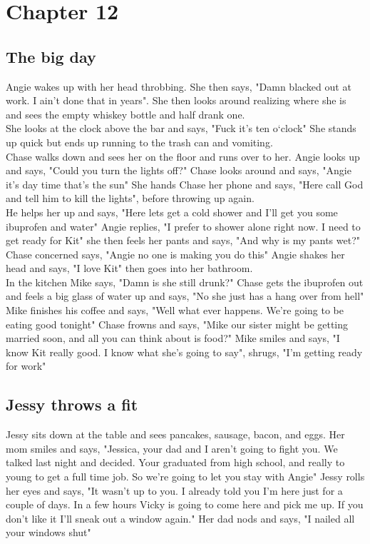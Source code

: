 \documentclass{article}[12px]
\begin{document}
\section* {Chapter 12}
\subsection* {The big day}
	Angie wakes up with her head throbbing. She then says, "Damn blacked out at work. I ain't done that in years". She then looks around realizing where she is and sees the empty whiskey bottle and half drank one.\\

	She looks at the clock above the bar and says, "Fuck it's ten o`clock" She stands up quick but ends up running to the trash can and vomiting.\\

	Chase walks down and sees her on the floor and runs over to her. Angie looks up and says, "Could you turn the lights off?" Chase looks around and says, "Angie it's day time that's the sun" She hands Chase her phone and says, "Here call God and tell him to kill the lights", before throwing up again.\\

	He  helps her up and says, "Here lets get a cold shower and I'll get you some ibuprofen and water" Angie replies, "I prefer to shower alone right now. I need to get ready for Kit" she then feels her pants and says, "And why is my pants wet?" Chase concerned says, "Angie no one is making you do this" Angie shakes her head and says, "I love Kit" then goes into her bathroom.\\

	In the kitchen Mike says, "Damn is she still drunk?" Chase gets the ibuprofen out and feels a big glass of water up and says, "No she just has a hang over from hell" Mike finishes his coffee and says, "Well what ever happens. We're going to be eating good tonight" Chase frowns and says, "Mike our sister might be getting married soon, and all you can think about is food?" Mike smiles and says, "I know Kit really good. I know what she's going to say", shrugs, "I'm getting ready for work"\\

\subsection* {Jessy throws a fit}
	Jessy sits down at the table and sees pancakes, sausage, bacon, and eggs. Her mom smiles and says, "Jessica, your dad and I aren't going to fight you. We talked last night and decided. Your graduated from high school, and really to young to get a full time job. So we're going to let you stay with Angie" Jessy rolls her eyes and says, "It wasn't up to you. I already told you I'm here just for a couple of days. In a few hours Vicky is going to come here and pick me up. If you don't like it I'll sneak out a window again." Her dad nods and says, "I nailed all your windows shut"\\
	
\end{document}
